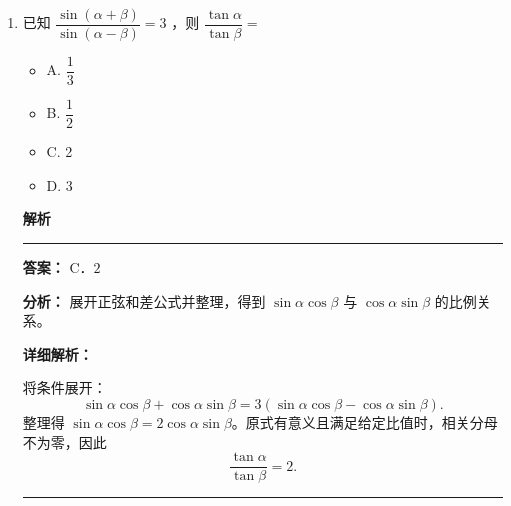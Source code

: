 \documentclass[UTF8,12pt,a4paper]{ctexart}
\newenvironment{examSolutionBox}{%
  \par\medskip\begingroup
  \setlength{\leftskip}{1.0em}\setlength{\rightskip}{0.9em}%
  \noindent\textcolor{SolutionTeal}{\bfseries\large 解析}\par
  \smallskip\noindent\textcolor{SolutionRule}{\rule{\dimexpr\linewidth-\leftskip-\rightskip\relax}{0.8pt}}\par
  \smallskip\color{SolutionInk}%
}{%
  \par\smallskip\noindent\textcolor{SolutionRule}{\rule{\dimexpr\linewidth-\leftskip-\rightskip\relax}{0.8pt}}\par
  \endgroup\medskip
}
\providecommand{\tightlist}{%
  \setlength{\itemsep}{0pt}\setlength{\parskip}{0pt}}
\begin{document}
\begin{enumerate}
  \begin{itemize}
  \tightlist
  \item
    A. 1
  \item
    B. \(\sqrt{2}\)
  \item
    C. \(\sqrt{3}\)
  \item
    D. 2
  \end{itemize}

  \begin{examSolutionBox}

  \textbf{答案：} B．\(\sqrt2\)

  \textbf{分析：} 利用向量和、差的模平方公式先求 \(\vec a\cdot\vec b\)，再计算 \(|\vec a+\vec b|\)。

  \textbf{详细解析：}

  因为 \(\vec a,\vec b\) 都是单位向量，
  \[
  |\vec a-\vec b|^2=|\vec a|^2+|\vec b|^2-2\vec a\cdot\vec b
  =2-2\vec a\cdot\vec b=2,
  \]
  所以 \(\vec a\cdot\vec b=0\)。于是
  \[
  |\vec a+\vec b|^2=|\vec a|^2+|\vec b|^2+2\vec a\cdot\vec b=2,
  \]
  故 \(|\vec a+\vec b|=\sqrt2\)。

  \end{examSolutionBox}
\item
  已知 \(\dfrac{\sin(\alpha+\beta)}{\sin(\alpha-\beta)}=3\) ，则 \(\dfrac{\tan\alpha}{\tan\beta}=\)

  \begin{itemize}
  \tightlist
  \item
    A. \(\dfrac{1}{3}\)
  \item
    B. \(\dfrac{1}{2}\)
  \item
    C. 2
  \item
    D. 3
  \end{itemize}

  \begin{examSolutionBox}

  \textbf{答案：} C．\(2\)

  \textbf{分析：} 展开正弦和差公式并整理，得到 \(\sin\alpha\cos\beta\) 与 \(\cos\alpha\sin\beta\) 的比例关系。

  \textbf{详细解析：}

  将条件展开：
  \[
  \sin\alpha\cos\beta+\cos\alpha\sin\beta
  =3(\sin\alpha\cos\beta-\cos\alpha\sin\beta).
  \]
  整理得 \(\sin\alpha\cos\beta=2\cos\alpha\sin\beta\)。原式有意义且满足给定比值时，相关分母不为零，因此
  \[
  \frac{\tan\alpha}{\tan\beta}=2.
  \]

  \end{examSolutionBox}
\end{enumerate}
\end{document}
